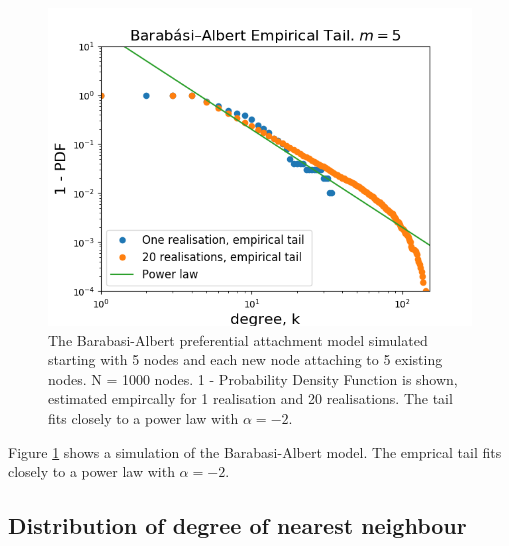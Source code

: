 \documentclass{article}
\begin{document}
\begin{figure}[H]
\includegraphics[scale=0.8]{barabasi_a.png} 
\caption{The Barabasi-Albert preferential attachment model simulated starting with 5 nodes and each new node attaching to 5 existing nodes. N = 1000 nodes. 1 - Probability Density Function is shown, estimated empircally for 1 realisation and 20 realisations. The tail fits closely to a power law with $\alpha=-2$.} 
\label{fig:barabasi}
\end{figure}

Figure \ref{fig:barabasi} shows a simulation of the Barabasi-Albert model. The emprical tail fits closely to a power law with $\alpha = -2$.

\subsection{Distribution of degree of nearest neighbour}
\end{document}
